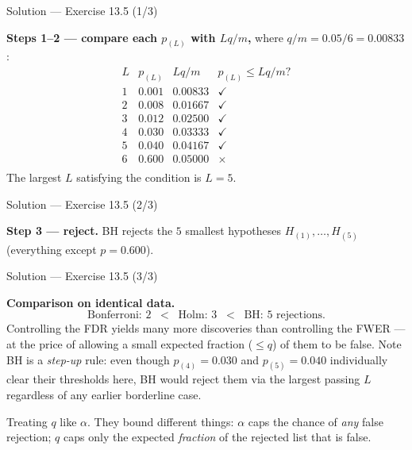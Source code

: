 \documentclass[aspectratio=169,11pt]{beamer}
\begin{document}
\begin{frame}{Solution --- Exercise 13.5 (1/3)}
\begin{solutionbox}
  \textbf{Steps 1--2 --- compare each $p_{(L)}$ with $L q / m$,}
  where $q/m = 0.05/6 = 0.00833$:
  \[
    \begin{array}{c|c|c|c}
      L & p_{(L)} & Lq/m & p_{(L)} \le Lq/m ? \\ \hline
      1 & 0.001 & 0.00833 & \checkmark \\
      2 & 0.008 & 0.01667 & \checkmark \\
      3 & 0.012 & 0.02500 & \checkmark \\
      4 & 0.030 & 0.03333 & \checkmark \\
      5 & 0.040 & 0.04167 & \checkmark \\
      6 & 0.600 & 0.05000 & \times \\
    \end{array}
  \]
  The largest $L$ satisfying the condition is $L = 5$.
\end{solutionbox}
\end{frame}

\begin{frame}{Solution --- Exercise 13.5 (2/3)}
\begin{solutionbox}
  \textbf{Step 3 --- reject.} BH rejects the $5$ smallest hypotheses
  $H_{(1)}, \ldots, H_{(5)}$ (everything except $p = 0.600$).
\end{solutionbox}
\end{frame}

\begin{frame}{Solution --- Exercise 13.5 (3/3)}
\begin{solutionbox}
  \medskip
  \textbf{Comparison on identical data.}
  \[
    \text{Bonferroni: 2} \;\;<\;\; \text{Holm: 3}
    \;\;<\;\; \text{BH: 5 rejections.}
  \]
  Controlling the FDR yields many more discoveries than controlling
  the FWER --- at the price of allowing a small expected fraction
  ($\le q$) of them to be false. Note BH is a \emph{step-up} rule: even
  though $p_{(4)} = 0.030$ and $p_{(5)} = 0.040$ individually clear
  their thresholds here, BH would reject them via the largest passing
  $L$ regardless of any earlier borderline case.

\end{solutionbox}
\begin{mistake}
  Treating $q$ like $\alpha$. They bound different things: $\alpha$ caps the
  chance of \emph{any} false rejection; $q$ caps only the expected
  \emph{fraction} of the rejected list that is false.
\end{mistake}
\end{frame}
\end{document}
